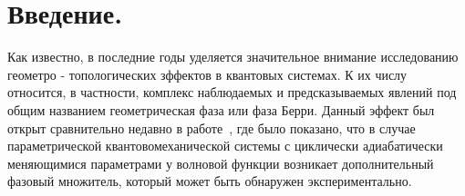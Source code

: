 \documentclass[a4paper,titlepage]{article}
\begin{document}

\newpage

\tableofcontents


\newpage
\section{Введение.}

Как известно, в последние годы уделяется значительное внимание исследованию
геометро - топологических зффектов в квантовых системах. К их числу
относится, в частности, комплекс наблюдаемых и предсказываемых явлений
под общим названием геометрическая фаза или фаза Берри. Данный эффект был
открыт сравнительно недавно в работе~\cite{FirstBerryWork}, где было показано,
что в случае параметрической квантовомеханической системы с циклически
адиабатически меняющимися параметрами у волновой функции возникает
дополнительный фазовый множитель, который может быть обнаружен
экспериментально.
\end{document}
